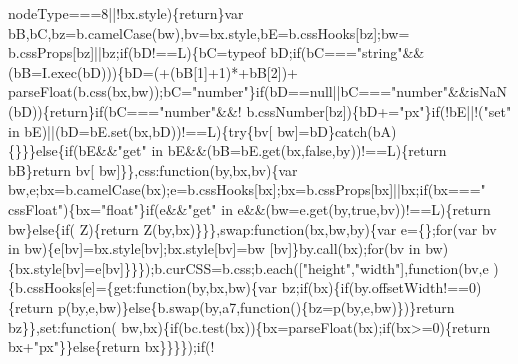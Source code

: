 \begin{DoxyCode}
      nodeType===8||!bx.style)\{\textcolor{keywordflow}{return}\}var bB,bC,bz=b.camelCase(bw),bv=bx.style,bE=b.cssHooks[bz];bw=
      b.cssProps[bz]||bz;\textcolor{keywordflow}{if}(bD!==L)\{bC=typeof bD;\textcolor{keywordflow}{if}(bC===\textcolor{stringliteral}{"string"}&&(bB=I.exec(bD)))\{bD=(+(bB[1]+1)*+bB[2])+
      parseFloat(b.css(bx,bw));bC=\textcolor{stringliteral}{"number"}\}\textcolor{keywordflow}{if}(bD==null||bC===\textcolor{stringliteral}{"number"}&&isNaN(bD))\{\textcolor{keywordflow}{return}\}\textcolor{keywordflow}{if}(bC===\textcolor{stringliteral}{"number"}&&!
      b.cssNumber[bz])\{bD+=\textcolor{stringliteral}{"px"}\}\textcolor{keywordflow}{if}(!bE||!(\textcolor{stringliteral}{"set"} in bE)||(bD=bE.set(bx,bD))!==L)\{\textcolor{keywordflow}{try}\{bv[
      bw]=bD\}\textcolor{keywordflow}{catch}(bA)\{\}\}\}\textcolor{keywordflow}{else}\{\textcolor{keywordflow}{if}(bE&&\textcolor{stringliteral}{"get"} in bE&&(bB=bE.get(bx,\textcolor{keyword}{false},by))!==L)\{\textcolor{keywordflow}{return} bB\}\textcolor{keywordflow}{return} bv[
      bw]\}\},css:\textcolor{keyword}{function}(by,bx,bv)\{var bw,e;bx=b.camelCase(bx);e=b.cssHooks[bx];bx=b.cssProps[bx]||bx;\textcolor{keywordflow}{if}(bx===\textcolor{stringliteral}{"
      cssFloat"})\{bx=\textcolor{stringliteral}{"float"}\}\textcolor{keywordflow}{if}(e&&\textcolor{stringliteral}{"get"} in e&&(bw=e.get(by,\textcolor{keyword}{true},bv))!==L)\{\textcolor{keywordflow}{return} bw\}\textcolor{keywordflow}{else}\{\textcolor{keywordflow}{if}(
      Z)\{\textcolor{keywordflow}{return} Z(by,bx)\}\}\},swap:\textcolor{keyword}{function}(bx,bw,by)\{var e=\{\};\textcolor{keywordflow}{for}(var bv in bw)\{e[bv]=bx.style[bv];bx.style[bv]=bw
      [bv]\}by.call(bx);\textcolor{keywordflow}{for}(bv in bw)\{bx.style[bv]=e[bv]\}\}\});b.curCSS=b.css;b.each([\textcolor{stringliteral}{"height"},\textcolor{stringliteral}{"width"}],\textcolor{keyword}{function}(bv,e
      )\{b.cssHooks[e]=\{\textcolor{keyword}{get}:\textcolor{keyword}{function}(by,bx,bw)\{var bz;\textcolor{keywordflow}{if}(bx)\{\textcolor{keywordflow}{if}(by.offsetWidth!==0)\{\textcolor{keywordflow}{return} 
      p(by,e,bw)\}\textcolor{keywordflow}{else}\{b.swap(by,a7,\textcolor{keyword}{function}()\{bz=p(by,e,bw)\})\}\textcolor{keywordflow}{return} bz\}\},\textcolor{keyword}{set}:\textcolor{keyword}{function}(
      bw,bx)\{\textcolor{keywordflow}{if}(bc.test(bx))\{bx=parseFloat(bx);\textcolor{keywordflow}{if}(bx>=0)\{\textcolor{keywordflow}{return} bx+\textcolor{stringliteral}{"px"}\}\}\textcolor{keywordflow}{else}\{\textcolor{keywordflow}{return} bx\}\}\}\});\textcolor{keywordflow}{if}(!

\end{DoxyCode}
